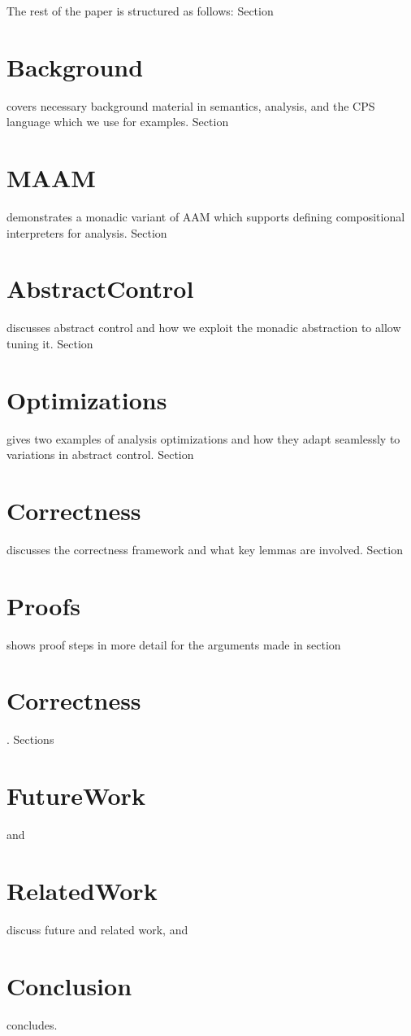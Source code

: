 \documentclass{article}
\begin{document}
The rest of the paper is structured as follows:
Section \section{Background} covers necessary background material in semantics, analysis, and the CPS language which we use for examples.
Section \section{MAAM} demonstrates a monadic variant of AAM which supports defining compositional interpreters for analysis.
Section \section{AbstractControl} discusses abstract control and how we exploit the monadic abstraction to allow tuning it.
Section \section{Optimizations} gives two examples of analysis optimizations and how they adapt seamlessly to variations in abstract control.
Section \section{Correctness} discusses the correctness framework and what key lemmas are involved.
Section \section{Proofs} shows proof steps in more detail for the arguments made in section \section{Correctness}.
Sections \section{FutureWork} and \section{RelatedWork} discuss future and related work, and \section{Conclusion} concludes.

\end{document}
